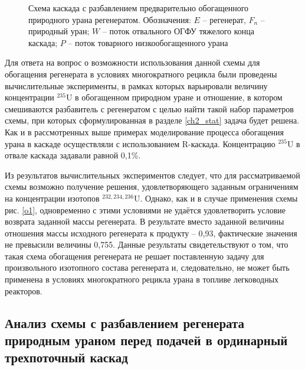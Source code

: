 \begin{figure}[ht]
  \caption{Схема каскада с разбавлением предварительно обогащенного природного урана регенератом. Обозначения: $E$ -- регенерат, $F_n$ -- природный уран; $W$ -- поток отвального ОГФУ тяжелого конца каскада; $P$ -- поток товарного низкообогащенного урана}\label{o2}
\end{figure}

Для ответа на вопрос о возможности использования данной схемы для обогащения регенерата в условиях многократного рецикла были проведены вычислительные эксперименты, в рамках которых варьировали величину концентрации $^{235}$U в обогащенном природном уране и отношение, в котором смешиваются разбавитель с регенератом с целью найти такой набор параметров схемы, при которых сформулированная в разделе \ref{ch2_stat} задача будет решена. Как и в рассмотренных выше примерах моделирование процесса обогащения урана в каскаде осуществляли с использованием R-каскада. Концентрацию $^{235}$U в отвале каскада задавали равной 0,1\%.

Из результатов вычислительных экспериментов следует, что для рассматриваемой схемы возможно получение решения, удовлетворяющего заданным ограничениям на концентрации изотопов $^{232,234,236}$U. Однако, как и в случае применения схемы рис. \ref{o1}, одновременно с этими условиями не удаётся удовлетворить условие возврата заданной массы регенерата. В результате вместо заданной величины отношения массы исходного регенерата к продукту -- 0,93, фактические значения не превысили величины 0,755. Данные результаты свидетельствуют о том, что такая схема обогащения регенерата не решает поставленную задачу для произвольного изотопного состава регенерата и, следовательно, не может быть применена в условиях многократного рецикла урана в топливе легководных реакторов.

\subsection{Анализ схемы с разбавлением регенерата природным ураном перед подачей в ординарный трехпоточный каскад}


